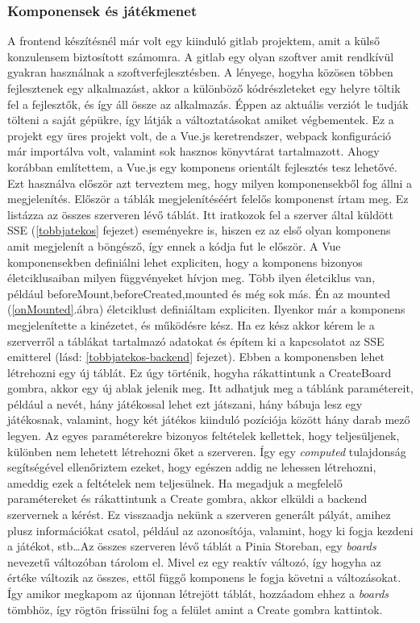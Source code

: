 \documentclass[a4paper,twoside]{article}
\begin{document}
\subsubsection{Komponensek és játékmenet}
A frontend készítésnél már volt egy kiinduló gitlab projektem, amit a külső konzulensem
biztosított számomra. A gitlab egy olyan szoftver amit rendkívül gyakran használnak a szoftverfejlesztésben. A lényege, hogyha közösen többen fejlesztenek egy alkalmazást, akkor a különböző kódrészleteket egy helyre töltik fel a fejlesztők, és így áll össze az alkalmazás. Éppen az aktuális verziót le tudják tölteni a saját gépükre, így látják a változtatásokat amiket végbementek. Ez a projekt egy üres projekt volt, de a Vue.js keretrendszer, webpack
konfiguráció már importálva volt, valamint sok hasznos könyvtárat tartalmazott. Ahogy
korábban említettem, a Vue.js egy komponens orientált fejlesztés tesz lehetővé. Ezt használva
először azt terveztem meg, hogy milyen komponensekből fog állni a megjelenítés.
Először a táblák megjelenítéséért felelős komponenst írtam meg. Ez listázza az összes
szerveren lévő táblát. Itt iratkozok fel a szerver által küldött SSE (\ref{tobbjatekos} fejezet) eseményekre is, hiszen ez az első olyan komponens amit megjelenít a böngésző, így ennek a kódja fut le először. A Vue komponensekben definiálni lehet expliciten, hogy a komponens bizonyos életciklusaiban milyen függvényeket hívjon meg. Több ilyen életciklus van, például beforeMount,beforeCreated,mounted és még sok más. Én az mounted (\ref{onMounted}.ábra) életciklust definiáltam expliciten. Ilyenkor már a komponens megjelenítette a kinézetet, és működésre kész. Ha ez kész akkor kérem le a szerverről a táblákat tartalmazó adatokat és építem ki a kapcsolatot az SSE emitterel (lásd: \ref{tobbjatekos-backend} fejezet). Ebben a komponensben lehet létrehozni egy új táblát. Ez úgy történik, hogyha rákattintunk a CreateBoard gombra, akkor egy új ablak jelenik meg. Itt adhatjuk meg a táblánk paramétereit, például a nevét, hány játékossal lehet ezt játszani, hány bábuja lesz egy játékosnak, valamint, hogy két játékos kiinduló pozíciója között hány darab mező legyen. Az egyes paraméterekre bizonyos feltételek kellettek, hogy teljesüljenek, különben nem lehetett létrehozni őket a szerveren. Így egy \textit{computed} tulajdonság segítségével ellenőriztem ezeket, hogy egészen addig ne lehessen létrehozni, ameddig ezek a feltételek nem teljesülnek. Ha megadjuk a megfelelő paramétereket és rákattintunk a Create gombra, akkor elküldi a backend szervernek a kérést. Ez visszaadja nekünk a szerveren generált pályát, amihez plusz információkat csatol, például az azonosítója, valamint, hogy ki fogja kezdeni a játékot, stb\ldots Az összes szerveren lévő táblát a Pinia Storeban, egy \textit{boards} nevezetű változóban tárolom el. Mivel ez egy reaktív változó, így hogyha az értéke változik az összes, ettől függő komponens le fogja követni a változásokat. Így amikor megkapom az újonnan létrejött táblát, hozzáadom ehhez a \textit{boards} tömbhöz, így rögtön frissülni fog a felület amint a Create gombra kattintok. 
\end{document}
